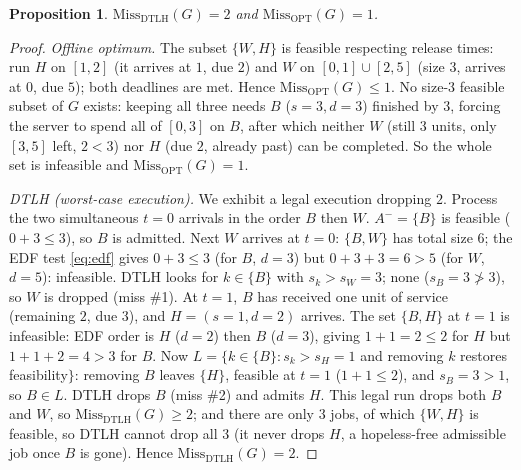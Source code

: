 \documentclass{amsart}
\newtheorem{proposition}[theorem]{Proposition}
\theoremstyle{definition}
\begin{document}
\begin{proposition}\label{prop:gadget}
$\mathrm{Miss}_{\mathrm{DTLH}}(G)=2$ and $\mathrm{Miss}_{\mathrm{OPT}}(G)=1$.
\end{proposition}

\begin{proof}
\emph{Offline optimum.} The subset $\{W,H\}$ is feasible respecting release
times: run $H$ on $[1,2]$ (it arrives at $1$, due $2$) and $W$ on
$[0,1]\cup[2,5]$ (size $3$, arrives at $0$, due $5$); both deadlines are met.
Hence $\mathrm{Miss}_{\mathrm{OPT}}(G)\le 1$. No size-$3$ feasible subset of $G$
exists: keeping all three needs $B$ ($s=3,d=3$) finished by $3$, forcing the
server to spend all of $[0,3]$ on $B$, after which neither $W$ (still $3$ units,
only $[3,5]$ left, $2<3$) nor $H$ (due $2$, already past) can be completed. So
the whole set is infeasible and $\mathrm{Miss}_{\mathrm{OPT}}(G)=1$.

\emph{DTLH (worst-case execution).} We exhibit a legal execution dropping $2$.
Process the two simultaneous $t=0$ arrivals in the order $B$ then $W$.
$A^-=\{B\}$ is feasible ($0+3\le 3$), so $B$ is admitted. Next $W$ arrives at
$t=0$: $\{B,W\}$ has total size $6$; the EDF test \eqref{eq:edf} gives $0+3\le 3$
(for $B$, $d=3$) but $0+3+3=6>5$ (for $W$, $d=5$): infeasible. DTLH looks for
$k\in\{B\}$ with $s_k>s_W=3$; none ($s_B=3\not>3$), so $W$ is dropped (miss
\#1). At $t=1$, $B$ has received one unit of service (remaining $2$, due $3$),
and $H=(s{=}1,d{=}2)$ arrives. The set $\{B,H\}$ at $t=1$ is infeasible: EDF
order is $H$ ($d=2$) then $B$ ($d=3$), giving $1+1=2\le2$ for $H$ but
$1+1+2=4>3$ for $B$. Now $L=\{k\in\{B\}: s_k>s_H=1$ and removing $k$ restores
feasibility$\}$: removing $B$ leaves $\{H\}$, feasible at $t=1$ ($1+1\le 2$), and
$s_B=3>1$, so $B\in L$. DTLH drops $B$ (miss \#2) and admits $H$. This legal run
drops both $B$ and $W$, so $\mathrm{Miss}_{\mathrm{DTLH}}(G)\ge 2$; and there are
only $3$ jobs, of which $\{W,H\}$ is feasible, so DTLH cannot drop all $3$ (it
never drops $H$, a hopeless-free admissible job once $B$ is gone). Hence
$\mathrm{Miss}_{\mathrm{DTLH}}(G)=2$.
\end{proof}
\end{document}
